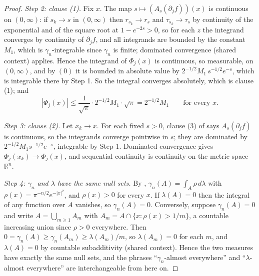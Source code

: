 \begin{proof}
\emph{Step 2: clause (1).}
Fix $x$.  The map $s \mapsto (A_s(\partial_jf))(x)$ is continuous on
$(0,\infty)$: if $s_k \to s$ in $(0,\infty)$ then $r_{s_k} \to r_s$ and
$\tau_{s_k} \to \tau_s$ by continuity of the exponential and of the square root
at $1-e^{-2s} > 0$, so for each $z$ the integrand converges by continuity of
$\partial_j f$, and all integrands are bounded by the constant $M_1$, which is
$\gamma_n$-integrable since $\gamma_n$ is finite; dominated convergence (shared
context) applies.  Hence the integrand of $\Phi_j(x)$ is continuous, so
measurable, on $(0,\infty)$, and by $(0)$ it is bounded in absolute value by
$2^{-1/2}M_1\,s^{-1/2}e^{-s}$, which is integrable there by Step 1.  So the
integral converges absolutely, which is clause (1); and
\begin{equation*}
  |\Phi_j(x)| \leq \frac{1}{\sqrt\pi}\cdot 2^{-1/2}M_1 \cdot \sqrt\pi
    = 2^{-1/2}M_1 \qquad\text{for every } x . \tag{1}
\end{equation*}

\emph{Step 3: clause (2).}
Let $x_k \to x$.  For each fixed $s > 0$, clause (3) of
 says $A_s(\partial_j f)$ is continuous, so the
integrands converge pointwise in $s$; they are dominated by
$2^{-1/2}M_1 s^{-1/2}e^{-s}$, integrable by Step 1.  Dominated convergence gives
$\Phi_j(x_k) \to \Phi_j(x)$, and sequential continuity is continuity on the
metric space $\mathbb{R}^n$.

\emph{Step 4: $\gamma_n$ and $\lambda$ have the same null sets.}
By , $\gamma_n(A) = \int_A \rho\,d\lambda$ with
$\rho(x) = \pi^{-n/2}e^{-|x|^2}$, and $\rho(x) > 0$ for every $x$.  If
$\lambda(A) = 0$ then the integral of any function over $A$ vanishes, so
$\gamma_n(A) = 0$.  Conversely, suppose $\gamma_n(A) = 0$ and write
$A = \bigcup_{m\geq1} A_m$ with $A_m = A \cap \{x : \rho(x) > 1/m\}$, a countable
increasing union since $\rho > 0$ everywhere.  Then
$0 = \gamma_n(A) \geq \gamma_n(A_m) \geq \lambda(A_m)/m$, so $\lambda(A_m) = 0$
for each $m$, and $\lambda(A) = 0$ by countable subadditivity (shared context).
Hence the two measures have exactly the same null sets, and the phrases
``$\gamma_n$-almost everywhere'' and ``$\lambda$-almost everywhere'' are
interchangeable from here on.


\end{proof}
